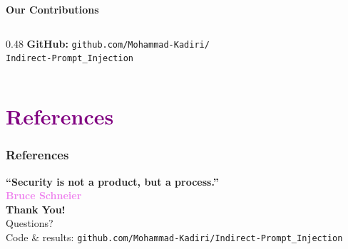 \documentclass[aspectratio=169]{beamer}
\begin{document}
\begin{frame}{\textcolor{cmindsblue}{\textbf{Our Contributions}}}
\begin{columns}[T]
\begin{column}{0.48\textwidth}
      \vspace{3mm}
      {\scriptsize \textbf{GitHub:}
      \texttt{github.com/Mohammad-Kadiri/}\\
      \texttt{Indirect-Prompt\_Injection}}
    \end{column}
  \end{columns}
\end{frame}


\section{\textbf{\textcolor{purple}{References}}}
\begin{frame}[allowframebreaks]
  \frametitle{References}
  
  
\end{frame}


\begin{frame}{}
  \begin{center}
    \textbf{\textcolor{blue!70}{\large
      ``Security is not a product, but a process.''}}\\
    \vspace{4mm}
    \textbf{\textcolor{violet}{Bruce Schneier}}\\
    \vspace{8mm}
    \textbf{\textcolor{teal!80}{\huge Thank You!}}\\
    \vspace{5mm}
    {\small \textcolor{cmindsblue}{Questions?}}\\
    \vspace{3mm}
    {\scriptsize
    Code \& results: \texttt{github.com/Mohammad-Kadiri/Indirect-Prompt\_Injection}
    }
  \end{center}
\end{frame}
\end{document}
